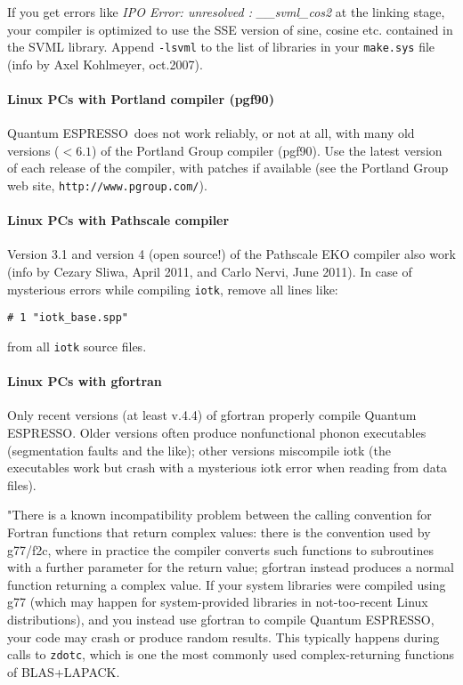 \documentclass[12pt,a4paper]{article}
\def\qe{{\sc Quantum ESPRESSO}}
\begin{document}
If you get errors like {\em IPO Error: unresolved : \_\_svml\_cos2}
at the linking stage, your compiler is optimized to use the SSE
version of sine, cosine etc. contained in the SVML library. Append
\texttt{-lsvml} to the list of libraries in your \texttt{make.sys} 
file (info by Axel Kohlmeyer, oct.2007). 

\paragraph{Linux PCs with Portland compiler (pgf90)}

\qe\ does not work reliably, or not at all, with many old
versions ($< 6.1$) of the Portland Group compiler (pgf90).
 Use the latest version of each 
release of the compiler, with patches if available (see
the Portland Group web site, \texttt{http://www.pgroup.com/}).

\paragraph{Linux PCs with Pathscale compiler}

Version 3.1 and version 4 (open source!) of the Pathscale EKO compiler
also work (info by Cezary Sliwa, April 2011, and Carlo Nervi, June 2011).
In case of mysterious errors while compiling \texttt{iotk},
remove all lines like:
\begin{verbatim}
# 1 "iotk_base.spp"
\end{verbatim}
from all \texttt{iotk} source files.

\paragraph{Linux PCs with gfortran}

Only recent versions (at least v.4.4) of gfortran properly compile \qe.
Older versions often produce nonfunctional phonon executables 
(segmentation faults and the like); other versions miscompile iotk 
(the executables work but crash with a mysterious iotk
error when reading from data files). 

"There is a known incompatibility problem between the calling 
convention for Fortran functions that return complex values: there is the
convention used by 
g77/f2c, where in practice the compiler converts such functions to subroutines 
with a further parameter for the return value; gfortran instead produces a 
normal function returning a complex value.
If your system libraries were compiled using g77 (which may happen for
system-provided libraries in not-too-recent Linux distributions),
and you instead use gfortran to compile \qe, your code
may crash or produce random results. This typically happens 
during calls to \texttt{zdotc}, which is one the most commonly used
complex-returning functions of BLAS+LAPACK.
\end{document}

